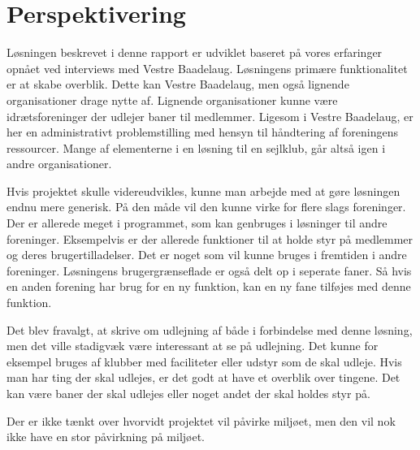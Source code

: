 \chapter{Perspektivering}
\label{cha:perspektivering}


Løsningen beskrevet i denne rapport er udviklet baseret på vores erfaringer opnået ved interviews med Vestre Baadelaug. Løsningens primære funktionalitet er at skabe overblik. Dette kan Vestre Baadelaug, men også lignende organisationer drage nytte af. Lignende organisationer kunne være idrætsforeninger der udlejer baner til medlemmer. Ligesom i Vestre Baadelaug, er her en administrativt  problemstilling med hensyn til håndtering af foreningens ressourcer. Mange af elementerne i en løsning til en sejlklub, går altså igen i andre organisationer.



Hvis projektet skulle videreudvikles, kunne man arbejde med at gøre løsningen endnu mere generisk. På den måde vil den kunne virke for flere slags foreninger. Der er allerede meget i programmet, som kan genbruges i løsninger til andre foreninger. Eksempelvis er der allerede funktioner til at holde styr på medlemmer og deres brugertilladelser. Det er noget som vil kunne bruges i fremtiden i andre foreninger. Løsningens brugergrænseflade er også delt op i seperate faner. Så hvis en anden forening har brug for en ny funktion, kan en ny fane tilføjes med denne funktion.

Det blev fravalgt, at skrive om udlejning af både i forbindelse med denne løsning, men det ville stadigvæk være interessant at se på udlejning. Det kunne for eksempel bruges af klubber med faciliteter eller udstyr som de skal udleje. Hvis man har ting der skal udlejes, er det godt at have et overblik over tingene. Det kan være baner der skal udlejes eller noget andet der skal holdes styr på.

Der er ikke tænkt over hvorvidt projektet vil påvirke miljøet, men den vil nok ikke have en stor påvirkning på miljøet.

